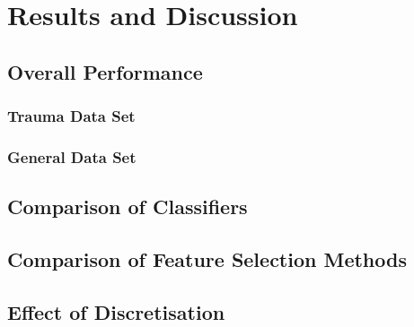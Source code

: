 \chapter{Results and Discussion} \label{chap:results}

\section{Overall Performance}
\subsection{Trauma Data Set}




\subsection{General Data Set}

\section{Comparison of Classifiers}

\section{Comparison of Feature Selection Methods}

\section{Effect of Discretisation}
